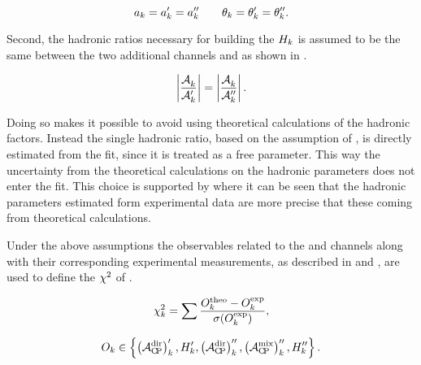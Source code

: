 \begin{equation}
a_k= a_k' = a_k'' \qquad \theta_k = \theta_k' = \theta_k''.
\label{su3_apply}
\end{equation}

\noindent Second, the hadronic ratios necessary for building the $H_{k}$ is assumed to be the same between
the two additional channels \BsJpsiKst and \BdJpsiRho as shown in .

\begin{equation}
  \centering
  \hadRatio{k}{}{\prime} =
  \hadRatio{k}{}{\prime\prime}.
    \label{had_ratios_assuption}
\end{equation}

\noindent Doing so makes it possible to avoid using theoretical calculations of the hadronic factors.
Instead the single hadronic ratio, based on the assumption of , is directly
estimated from the fit, since it is treated as a free parameter. This way the uncertainty from the theoretical
calculations on the hadronic parameters does not enter the fit. This choice is supported by \cite{DeBruyn-thesis}
where it can be seen that the hadronic parameters estimated form experimental data are more precise
that these coming from theoretical calculations.

Under the above assumptions the observables related to the \BsJpsiKst and \BdJpsiRho channels along
with their corresponding experimental measurements, as described in  and
, are used to define the $\chi^2$ of .

\begin{equation}
  \centering
  \chisq_k = \sum \frac{O^{\rm theo}_k - O^{\rm exp}_k} {\sigma(O^{\rm exp}_k)},
  \label{chisq_form}
\end{equation}


\begin{equation}
  \centering
  O_k \in \left\{ \parenthesis{\Acp{\rm dir}}'_k, \Hobs{k}', \parenthesis{\Acp{\rm dir}}''_k, \parenthesis{\Acp{\rm mix}}''_k, \Hobs{k}'' \right\}.
  \label{chisq_form_with}
\end{equation}

